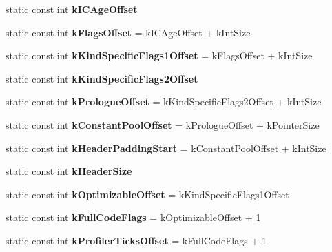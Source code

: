 \begin{DoxyCompactItemize}
\item 
static const int {\bfseries k\+I\+C\+Age\+Offset}
\item 
\hypertarget{classv8_1_1internal_1_1_code_a23fd16742a1176874d656c92b7ae7508}{}static const int {\bfseries k\+Flags\+Offset} = k\+I\+C\+Age\+Offset + k\+Int\+Size\label{classv8_1_1internal_1_1_code_a23fd16742a1176874d656c92b7ae7508}

\item 
\hypertarget{classv8_1_1internal_1_1_code_a4e602360adfc0e3ef37632b9931a67e8}{}static const int {\bfseries k\+Kind\+Specific\+Flags1\+Offset} = k\+Flags\+Offset + k\+Int\+Size\label{classv8_1_1internal_1_1_code_a4e602360adfc0e3ef37632b9931a67e8}

\item 
static const int {\bfseries k\+Kind\+Specific\+Flags2\+Offset}
\item 
\hypertarget{classv8_1_1internal_1_1_code_a8fb13656a444b42f2cd723b2cf8cbbae}{}static const int {\bfseries k\+Prologue\+Offset} = k\+Kind\+Specific\+Flags2\+Offset + k\+Int\+Size\label{classv8_1_1internal_1_1_code_a8fb13656a444b42f2cd723b2cf8cbbae}

\item 
\hypertarget{classv8_1_1internal_1_1_code_a52c00f1abff6940d618ed458c322f113}{}static const int {\bfseries k\+Constant\+Pool\+Offset} = k\+Prologue\+Offset + k\+Pointer\+Size\label{classv8_1_1internal_1_1_code_a52c00f1abff6940d618ed458c322f113}

\item 
\hypertarget{classv8_1_1internal_1_1_code_a84ec3741772ff38c7efa6001523ff3b8}{}static const int {\bfseries k\+Header\+Padding\+Start} = k\+Constant\+Pool\+Offset + k\+Int\+Size\label{classv8_1_1internal_1_1_code_a84ec3741772ff38c7efa6001523ff3b8}

\item 
static const int {\bfseries k\+Header\+Size}
\item 
\hypertarget{classv8_1_1internal_1_1_code_a1b5e5322587c1df215dbd6bffae595aa}{}static const int {\bfseries k\+Optimizable\+Offset} = k\+Kind\+Specific\+Flags1\+Offset\label{classv8_1_1internal_1_1_code_a1b5e5322587c1df215dbd6bffae595aa}

\item 
\hypertarget{classv8_1_1internal_1_1_code_ad599b35e9cb80eaaea242597f5799a07}{}static const int {\bfseries k\+Full\+Code\+Flags} = k\+Optimizable\+Offset + 1\label{classv8_1_1internal_1_1_code_ad599b35e9cb80eaaea242597f5799a07}

\item 
\hypertarget{classv8_1_1internal_1_1_code_af8bf1a33f4c8b234e3bb9b704f49b7b2}{}static const int {\bfseries k\+Profiler\+Ticks\+Offset} = k\+Full\+Code\+Flags + 1\label{classv8_1_1internal_1_1_code_af8bf1a33f4c8b234e3bb9b704f49b7b2}


\end{DoxyCompactItemize}
